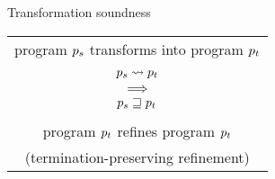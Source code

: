 \begin{frame}{Transformation soundness}
\Large
\centering
\begin{tabular}{c}
        program $\datalangProg_s$ transforms into program $\datalangProg_t$
    \\\\
        $\datalangProg_s \tmc \datalangProg_t$
    \\
        $\implies$
    \\
        $\datalangProg_s \refined \datalangProg_t$
    \\\\
        program $\datalangProg_t$ refines program $\datalangProg_t$
    \\
        (termination-preserving refinement)
\end{tabular}
\end{frame}